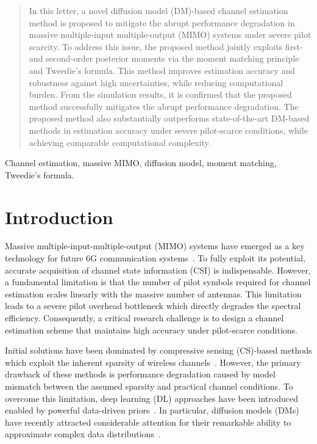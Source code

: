 \documentclass[lettersize,journal]{IEEEtran}
\begin{document}
\maketitle
\begin{abstract}
In this letter, a novel diffusion model (DM)-based channel estimation method is proposed to mitigate the abrupt performance degradation in massive multiple-input multiple-output (MIMO) systems under severe pilot scarcity. To address this issue, the proposed method jointly exploits first- and second-order posterior moments via the moment matching principle and Tweedie’s formula. This method improves estimation accuracy and robustness against high uncertainties, while reducing computational burden. From the simulation results, it is confirmed that the proposed method successfully mitigates the abrupt performance degradation. The proposed method also substantially outperforms state-of-the-art DM-based methods in estimation accuracy under severe pilot-scarce conditions, while achieving comparable computational complexity.
\end{abstract}

\begin{IEEEkeywords}
Channel estimation, massive MIMO, diffusion model, moment matching, Tweedie's formula.
\end{IEEEkeywords}


\section{Introduction}

Massive multiple-input-multiple-output (MIMO) systems have emerged as a key technology for future 6G communication systems~\cite{busariMillimeterWaveMassiveMIMO2018}. To fully exploit its potential, accurate acquisition of channel state information (CSI) is indispensable. However, a fundamental limitation is that the number of pilot symbols required for channel estimation scales linearly with the massive number of antennas. This limitation leads to a severe pilot overhead bottleneck which directly degrades the spectral efficiency. Consequently, a critical research challenge is to design a channel estimation scheme that maintains high accuracy under pilot-scarce conditions.

Initial solutions have been dominated by compressive sensing (CS)-based methods which exploit the inherent sparsity of wireless channels~\cite{zhangAtomicNormDenoisingBased2018,choiCompressedSensingWireless2017}. However, the primary drawback of these methods is performance degradation caused by model mismatch between the assumed sparsity and practical channel conditions. To overcome this limitation, deep learning (DL) approaches have been introduced enabled by powerful data-driven priors~\cite{kimDeepLearningaidedWireless2023}. In particular, diffusion models (DMs) have recently attracted considerable attention for their remarkable ability to approximate complex data distributions~\cite{hoDenoisingDiffusionProbabilistic2020,vanhuynhGenerativeAIPhysical2024}.
\end{document}
